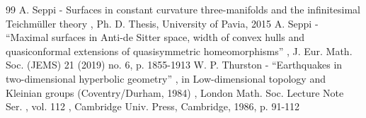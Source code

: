 \documentclass[11pt]{article}
\theoremstyle{plain}
\theoremstyle{definition}
\begin{document}
\begin{thebibliography}{99}
 A. Seppi - Surfaces in constant curvature three-manifolds and the infinitesimal Teichmüller theory , Ph. D. Thesis, University of Pavia, 2015
 A. Seppi - “Maximal surfaces in Anti-de Sitter space, width of convex hulls and quasiconformal extensions of quasisymmetric homeomorphisms” , J. Eur. Math. Soc. (JEMS) 21 (2019) no. 6, p. 1855-1913
 W. P. Thurston - “Earthquakes in two-dimensional hyperbolic geometry” , in Low-dimensional topology and Kleinian groups (Coventry/Durham, 1984) , London Math. Soc. Lecture Note Ser. , vol. 112 , Cambridge Univ. Press, Cambridge, 1986, p. 91-112
\end{thebibliography}
\end{document}
